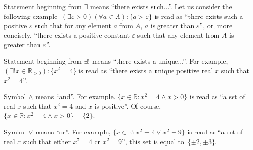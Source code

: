 \documentclass[../lecture-notes-148x210.tex]{subfiles}
\begin{document}
Statement beginning from $\exists$ means ``there exists such...''. Let us consider the following example: 
$(\exists \varepsilon > 0) (\forall a \in A): \{a > \varepsilon\}$ is read as ``there exists such a positive $\varepsilon$ such 
that for any element $a$ from $A$, $a$ is greater than $\varepsilon$'', or, more concisely, ``there exists a positive constant 
$\varepsilon$ such that any element from $A$ is greater than $\varepsilon$''.

Statement beginning from $\exists !$ means ``there exists a unique...''. For example, $(\exists! x \in \mathbb{R}_{>0}): \{x^2 = 4\}$ 
is read as ``there exists a unique positive real $x$ such that $x^2 = 4$''.

Symbol $\wedge$ means ``and''. For example, $\{x \in \mathbb{R}: x^2 = 4 \wedge x > 0\}$ is read as ``a set of real $x$ such that 
$x^2=4$ and $x$ is positive''. Of course, $\{x \in \mathbb{R}: x^2 = 4 \wedge x > 0\} = \{2\}$.

Symbol $\vee$ means ``or''. For example, $\{x \in \mathbb{R}: x^2 = 4 \vee x^2 = 9\}$ is read as ``a set of real $x$ such that 
either $x^2=4$ or $x^2=9$'', this set is equal to~$\{\pm 2, \pm 3\}$.
\end{document}
